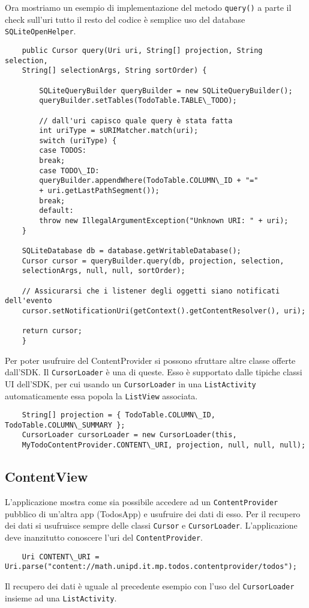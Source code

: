 	Ora mostriamo un esempio di implementazione del metodo \lstinline|query()| a parte il check sull'uri tutto il resto del codice è semplice uso del database \lstinline|SQLiteOpenHelper|.
	\begin{lstlisting}
	public Cursor query(Uri uri, String[] projection, String selection,
	String[] selectionArgs, String sortOrder) {

		SQLiteQueryBuilder queryBuilder = new SQLiteQueryBuilder();
		queryBuilder.setTables(TodoTable.TABLE\_TODO);
	
		// dall'uri capisco quale query è stata fatta
		int uriType = sURIMatcher.match(uri);
		switch (uriType) {
		case TODOS:
		break;
		case TODO\_ID:
		queryBuilder.appendWhere(TodoTable.COLUMN\_ID + "="
		+ uri.getLastPathSegment());
		break;
		default:
		throw new IllegalArgumentException("Unknown URI: " + uri);
	}

	SQLiteDatabase db = database.getWritableDatabase();
	Cursor cursor = queryBuilder.query(db, projection, selection,
	selectionArgs, null, null, sortOrder);

	// Assicurarsi che i listener degli oggetti siano notificati dell'evento
	cursor.setNotificationUri(getContext().getContentResolver(), uri);

	return cursor;
	}
	\end{lstlisting}

	Per poter usufruire del ContentProvider si possono sfruttare altre classe offerte dall'SDK. Il \lstinline|CursorLoader| è una di queste. Esso è supportato dalle tipiche classi UI dell'SDK, per cui usando un \lstinline|CursorLoader| in una \lstinline|ListActivity| automaticamente essa popola la \lstinline|ListView| associata.
	\begin{lstlisting}
	String[] projection = { TodoTable.COLUMN\_ID, TodoTable.COLUMN\_SUMMARY };
	CursorLoader cursorLoader = new CursorLoader(this,
	MyTodoContentProvider.CONTENT\_URI, projection, null, null, null);
	\end{lstlisting}


	\subsection{ContentView}
	L'applicazione mostra come sia possibile accedere ad un
\lstinline|ContentProvider| pubblico di un'altra app (TodosApp) e usufruire dei
dati di esso. Per il recupero dei dati si usufruisce sempre delle classi
\lstinline|Cursor| e \lstinline|CursorLoader|.
	L'applicazione deve inanzitutto conoscere l'uri del \lstinline|ContentProvider|.
	\begin{lstlisting}
	Uri CONTENT\_URI = Uri.parse("content://math.unipd.it.mp.todos.contentprovider/todos");
	\end{lstlisting}
	Il recupero dei dati è uguale al precedente esempio con l'uso del
\lstinline|CursorLoader| insieme ad una \lstinline|ListActivity|.

